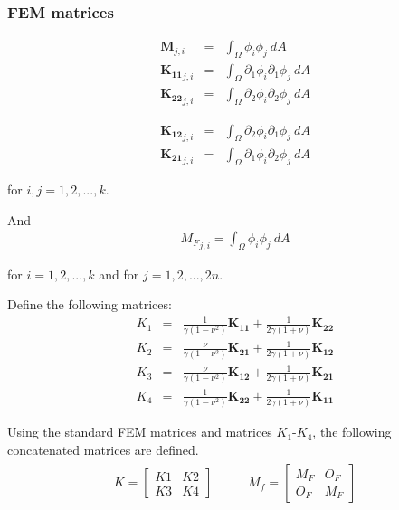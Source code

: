 \subsubsection{FEM matrices}
\noindent\begin{minipage}{.5\linewidth}
	\begin{eqnarray*}
		\mathbf{M}_{j,i} & = & \int_{\Omega} \phi_i \phi_j ~dA \\
		\mathbf{{K}_{11}}_{j,i} & = & \int_{\Omega} \partial_1\phi_i \partial_1\phi_j~dA\\
		\mathbf{{K}_{22}}_{j,i} & = & \int_{\Omega} \partial_2\phi_i \partial_2\phi_j~dA
	\end{eqnarray*}
\end{minipage}%
\begin{minipage}{.5\linewidth}
	\begin{eqnarray*}
		\mathbf{{K}_{12}}_{j,i} & = & \int_{\Omega} \partial_2\phi_i \partial_1\phi_j~dA\\
		\mathbf{{K}_{21}}_{j,i} & = & \int_{\Omega} \partial_1\phi_i \partial_2\phi_j~dA
	\end{eqnarray*}
\end{minipage}
for $i,j = 1,2,...,k$.

And 
\begin{eqnarray*}
	{M_{F}}_{j,i} = \int_{\Omega}  \phi_i \phi_j~dA
\end{eqnarray*}

for $i = 1,2,...,k$ and for $j =1,2,...,2n$.

Define the following matrices:
\begin{eqnarray*}
	K_1 & = & \frac{1}{\gamma(1-\nu^2)} \mathbf{K_{11}} + \frac{1}{2\gamma(1+\nu)}\mathbf{K_{22}} \label{eq:2DFEM:K1} \\
	K_2 & = & \frac{\nu}{\gamma(1-\nu^2)} \mathbf{K_{21}} + \frac{1}{2\gamma(1+\nu)}\mathbf{K_{12}}\label{eq:2DFEM:K2}\\
	K_3 & = & \frac{\nu}{\gamma(1-\nu^2)} \mathbf{K_{12}} + \frac{1}{2\gamma(1+\nu)}\mathbf{K_{21}}\label{eq:2DFEM:K3}\\
	K_4 & = & \frac{1}{\gamma(1-\nu^2)} \mathbf{K_{22}} + \frac{1}{2\gamma(1+\nu)}\mathbf{K_{11}}\label{eq:2DFEM:K4}
\end{eqnarray*}

Using the standard FEM matrices and matrices $K_1$-$K_4$, the following concatenated matrices are defined.
\begin{eqnarray}
	\begin{aligned}
		K = 
		\begin{bmatrix}
			K1 & K2\\
			K3 & K4
		\end{bmatrix}
	\end{aligned}
	\ \ \ \ \ \ \ \ \
	\begin{aligned}
		M_f = 
		\begin{bmatrix}
			M_{F} & O_{F}\\
			O_{F} & M_{F}
		\end{bmatrix}
	\end{aligned}\label{eq:2DFEM:K+M}
\end{eqnarray}

